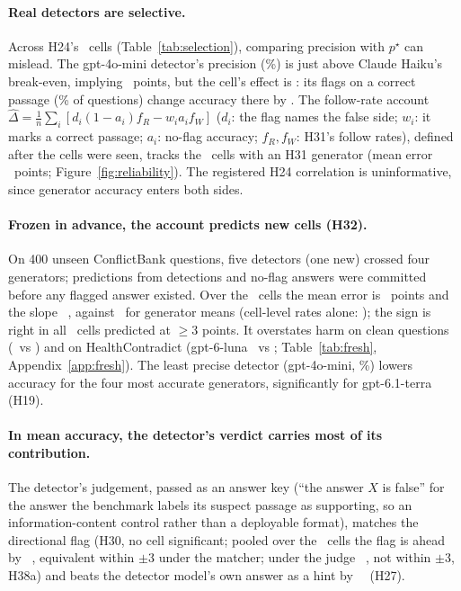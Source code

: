 \paragraph{Real detectors are selective.} Across H24's \hTwentyFourCells\ cells
(Table~\ref{tab:selection}), comparing precision with $p^\star$ can mislead. The gpt-4o-mini detector's precision
(\selHaikuMiniPrec\%) is just above Claude Haiku's break-even, implying \selHaikuMiniMarg\ points, but the cell's effect is
\selHaikuMiniObs: its flags on a correct passage (\selHaikuMiniWrongShare\% of questions) change accuracy there by
\selHaikuMiniWrongGain. The follow-rate account
$\hat\Delta=\frac1n\sum_i[d_i(1-a_i)f_R-w_ia_if_W]$ ($d_i$: the flag names the false side; $w_i$: it marks a correct
passage; $a_i$: no-flag accuracy; $f_R,f_W$: H31's follow rates), defined after the cells were seen, tracks the
\predEightN\ cells with an H31 generator (mean error \predEightMae\ points; Figure~\ref{fig:reliability}).
The registered H24 correlation is uninformative, since generator accuracy enters both sides.

\paragraph{Frozen in advance, the account predicts new cells (H32).} On 400 unseen ConflictBank questions, five
detectors (one new) crossed four generators; predictions from detections and no-flag answers were committed before
any flagged answer existed. Over the \frN\ cells the mean error is \frMae\ points and the slope \frSlope\
\frSlopeCI, against \frMaeGen\ for generator means (cell-level rates alone: \frMaeMarg); the sign is right in all
\frBigN\ cells predicted at $\ge$3 points. It overstates harm on clean questions (\frCleanPred\ vs \frCleanObs) and
on HealthContradict (gpt-6-luna \hcLlmPredLuna\ vs \hcLlmLuna; Table~\ref{tab:fresh}, Appendix~\ref{app:fresh}). The least precise detector (gpt-4o-mini, \dirPrecMini\%) lowers accuracy for the four most
accurate generators, significantly for gpt-6.1-terra (H19).

\paragraph{In mean accuracy, the detector's verdict carries most of its contribution.} The detector's judgement, passed as an answer key (``the
answer $X$ is false'' for the answer the benchmark labels its suspect passage as supporting, so an information-content
control rather than a deployable format), matches the directional flag
(H30, no cell significant; pooled over the \PoolThirtyAK\ cells the flag
is ahead by \PoolThirtyA\ \PoolThirtyACI, equivalent within $\pm$3 under the matcher; under the judge
\jdThirtyJ\ \jdThirtyJCI, not within $\pm$3, H38a) and beats the detector model's own answer as a
hint by \PoolThirtyB\ \PoolThirtyBCI\ (H27).

